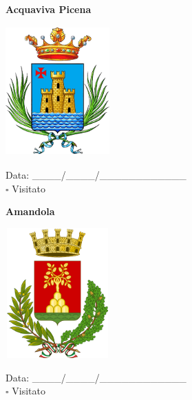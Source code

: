 \documentclass[a5paper,12pt]{article}
\begin{document}
\noindent
\begin{minipage}[t]{0.45\textwidth}
    \begin{center}
        \textbf{Acquaviva Picena}
    \end{center}
    \vspace{-0.5cm} %
    \begin{center}
        \includegraphics[height= 5cm, width=4cm]{Marche/Stemma Acquaviva Picena.png}
    \end{center}
    \vspace{-0.4cm} %
    \begin{flushleft}
        Data: \_\_\_\_/\_\_\_\_/\_\_\_\_\_\_\_\_\_\_\_\_ \\
        $\square$ Visitato
    \end{flushleft}
\end{minipage}
\hfill
\noindent
\begin{minipage}[t]{0.45\textwidth}
    \begin{center}
        \textbf{Amandola}
    \end{center}
    \vspace{-0.5cm} %
    \begin{center}
        \includegraphics[height= 5cm, width=4cm]{Marche/Stemma Amandola.png}
    \end{center}
    \vspace{-0.4cm} %
    \begin{flushleft}
        Data: \_\_\_\_/\_\_\_\_/\_\_\_\_\_\_\_\_\_\_\_\_ \\
        $\square$ Visitato
    \end{flushleft}
\end{minipage}
\end{document}
